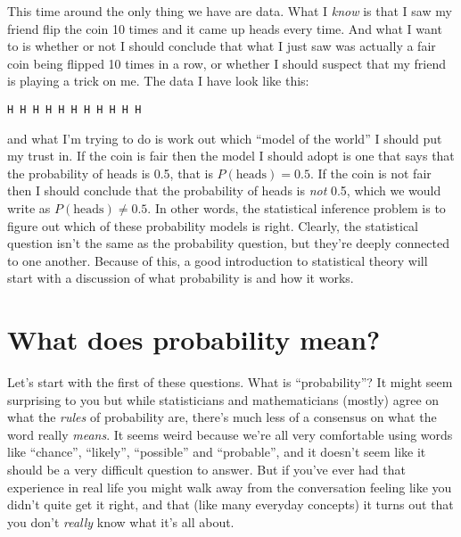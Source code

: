 This time around the only thing we have are data. What I {\it know} is that I saw my friend flip the coin 10 times and it came up heads every time. And what I want to  is whether or not I should conclude that what I just saw was actually a fair coin being flipped 10 times in a row, or whether I should suspect that my friend is playing a trick on me. The data I have look like this:
\begin{verbatim}
H H H H H H H H H H H
\end{verbatim}
and what I'm trying to do is work out which ``model of the world'' I should put my trust in. If the coin is fair then the model I should adopt is one that says that the probability of heads is 0.5, that is $P(\mbox{heads}) = 0.5$. If the coin is not fair then I should conclude that the probability of heads is {\it not} 0.5, which we would write as $P(\mbox{heads}) \neq 0.5$. In other words, the statistical inference problem is to figure out which of these probability models is right. Clearly, the statistical question isn't the same as the probability question, but they're deeply connected to one another. Because of this, a good introduction to statistical theory will start with a discussion of what probability is and how it works.
 

\section{What does probability mean?\label{sec:probmeaning}}

Let's start with the first of these questions. What is ``probability''? It might seem surprising to you but while statisticians and mathematicians (mostly) agree on what the {\it rules} of probability are, there's much less of a consensus on what the word really {\it means}. It seems weird because we're all very comfortable using words like ``chance'', ``likely'', ``possible'' and ``probable'', and it doesn't seem like it should be a very difficult question to answer. But if you've ever had that experience in real life you might walk away from the conversation feeling like you didn't quite get it right, and that (like many everyday concepts) it turns out that you don't {\it really} know what it's all about. 

